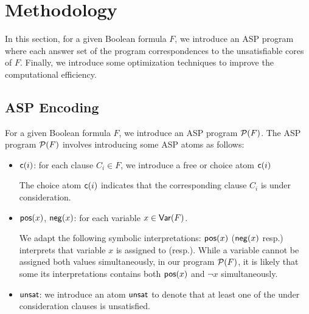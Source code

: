 \section{Methodology}
In this section, for a given Boolean formula $F$, we introduce an ASP program where each answer set of the program correspondences to the unsatisfiable cores of $F$.
Finally, we introduce some optimization techniques to improve the computational efficiency.  
\subsection{ASP Encoding}
For a given Boolean formula $F$, we introduce an ASP program $\mathcal{P}(F)$.
The ASP program $\mathcal{P}(F)$ involves introducing some ASP atoms as follows:
\begin{itemize}
  \item $\mathsf{c}(i)$: for each clause $C_i \in F$, we introduce a free or choice atom $\mathsf{c}(i)$
  
  The choice atom $\mathsf{c}(i)$ indicates that the corresponding clause $C_i$ is under consideration. 
  \item $\mathsf{pos}(x)$, $\mathsf{neg}(x)$: for each variable $x \in \mathsf{Var}(F)$. 
  
  We adapt the following symbolic interpretations: $\mathsf{pos}(x)$ ($\mathsf{neg}(x)$ resp.) interprets that variable $x$ is assigned to \true (\false resp.). While 
  a variable cannot be assigned both values simultaneously, in our program $\mathcal{P}(F)$, it is likely that some its interpretations contains both $\mathsf{pos}(x)$ and $\neg{x}$ simultaneously. 
  \item $\mathsf{unsat}$: we introduce an atom $\mathsf{unsat}$ to denote that at least one of the under consideration clauses is unsatisfied.
\end{itemize}
